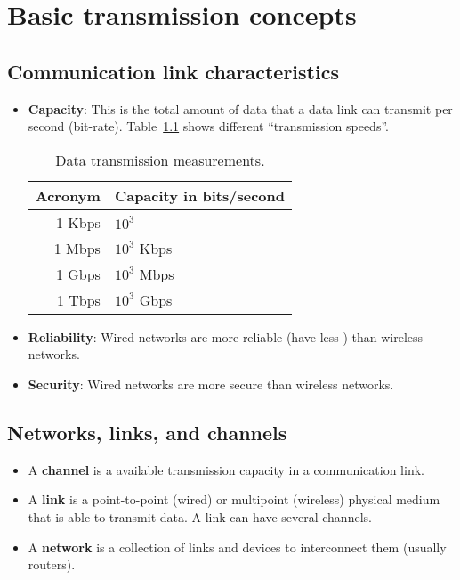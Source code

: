 \chapter{Basic transmission concepts}

\section{Communication link characteristics}
\begin{itemize}
\item \textbf{Capacity}: This is the total amount of data that a data
  link can transmit per second (bit-rate). Table~\ref{tab:BR_measures}
  shows different ``transmission speeds''.
  \begin{table}[!h]
    \vspace{2ex}
    \begin{center}
      \begin{tabular}{r|l}
        Acronym & Capacity in bits/second\\
        \hline
        1 Kbps & $10^3$\\
        1 Mbps & $10^3$ Kbps\\
        1 Gbps & $10^3$ Mbps\\
        1 Tbps & $10^3$ Gbps
      \end{tabular}
    \end{center}
    \caption{Data transmission measurements.}
    \label{tab:BR_measures}
  \end{table}
\item \textbf{Reliability}: Wired networks are more reliable
(have less ) than wireless networks.
\item \textbf{Security}: Wired networks are more secure than wireless
networks.
\end{itemize}

\section{Networks, links, and channels}
\begin{itemize}
\item A \textbf{channel} is a available transmission capacity in a communication link.
\item A \textbf{link} is a point-to-point (wired) or multipoint
(wireless) physical medium that is able to transmit data. A link can have several channels.
\item A \textbf{network} is a collection of links and devices to
interconnect them (usually routers).
\end{itemize}

